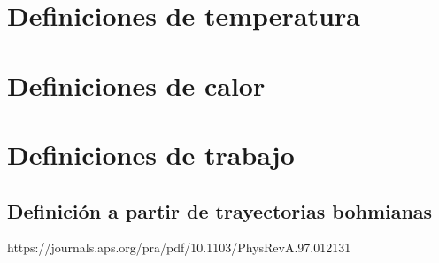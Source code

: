 \documentclass{article}
\begin{document}
\section{Definiciones de temperatura}

\section{Definiciones de calor}

\section{Definiciones de trabajo}
\subsection{Definición a partir de trayectorias bohmianas}
https://journals.aps.org/pra/pdf/10.1103/PhysRevA.97.012131
\end{document}
